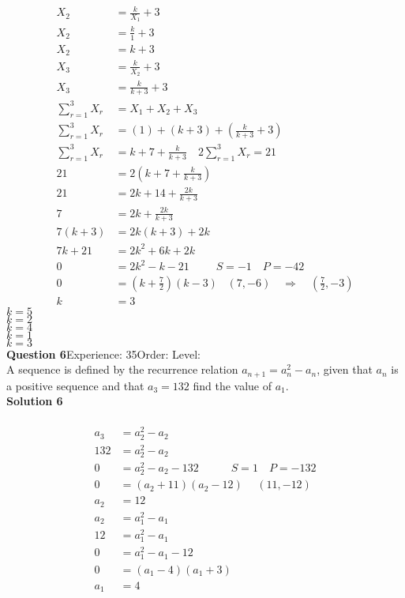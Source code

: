 \documentclass{article}
\begin{document}
\\[-10pt]\begin{align*}
X_2&=\displaystyle\frac{k}{X_1}+3\\[2pt]
X_2&=\displaystyle\frac{k}{1}+3\\[2pt]
X_2&=k+3\\[12pt]
X_3&=\displaystyle\frac{k}{X_2}+3\\[2pt]
X_3&=\displaystyle\frac{k}{k+3}+3\\[12pt]
\displaystyle\sum_{r=1}^{3} X_r&=X_1+X_2+X_3\\[2pt]
\displaystyle\sum_{r=1}^{3} X_r&=(1)+(k+3)+\left(\displaystyle\frac{k}{k+3}+3\right)\\[2pt]
\displaystyle\sum_{r=1}^{3} X_r&=k+7+\displaystyle\frac{k}{k+3}\quad 2\displaystyle\sum_{r=1}^{3} X_r=21\\[2pt]
21&=2\left(k+7+\displaystyle\frac{k}{k+3}\right)\\[2pt]
21&=2k+14+\displaystyle\frac{2k}{k+3}\\[2pt]
7&=2k+\displaystyle\frac{2k}{k+3}\\[2pt]
7(k+3)&=2k(k+3)+2k\\[2pt]
7k+21&=2k^2+6k+2k\\[2pt]
0&=2k^2-k-21\hspace{29pt}S=-1\quad P=-42\\[2pt]
0&=\left(k+\displaystyle\frac{7}{2}\right)(k-3)\hspace{10pt}(7,-6)\quad \Rightarrow \quad \left(\displaystyle\frac{7}{2},-3\right)\\[2pt]
k&=3
\end{align*}
$k=5$\\
$k=2$\\
$k=4$\\
$k=1$\\
$k=3$\\
\noindent\textbf{Question 6}\hspace{20pt}Experience: 35\hspace{20pt}Order: \hspace{20pt}Level: \\[2pt]
A sequence is defined by the recurrence relation $a_{n+1}=a_n^2-a_n$, given that $a_n$ is a positive sequence and that $a_3=132$ find the value of $a_1$.\\[4pt]
\noindent\textbf{Solution 6}\\[2pt]
\\[-10pt]\begin{align*}
a_3&=a_2^2-a_2\\[2pt]
132&=a_2^2-a_2\\[2pt]
0&=a_2^2-a_2-132 \hspace{35pt} S=1 \quad P=-132\\[2pt]
0&=(a_2+11)(a_2-12)\hspace{15pt} (11,-12)\\[2pt]
a_2&=12\\[12pt]
a_2&=a_1^2-a_1\\[2pt]
12&=a_1^2-a_1\\[2pt]
0&=a_1^2-a_1-12\\[2pt]
0&=(a_1-4)(a_1+3)\\[2pt]
a_1&=4
\end{align*}
\end{document}

